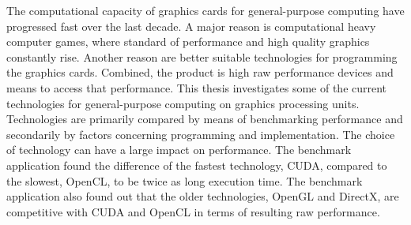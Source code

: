The computational capacity of graphics cards for general-purpose computing have progressed fast over the last decade. A major reason is computational heavy computer games, where standard of performance and high quality graphics constantly rise. Another reason are better suitable technologies for programming the graphics cards. Combined, the product is high raw performance devices and means to access that performance. This thesis investigates some of the current technologies for general-purpose computing on graphics processing units. Technologies are primarily compared by means of benchmarking performance and secondarily by factors concerning programming and implementation. The choice of technology can have a large impact on performance. The benchmark application found the difference of the fastest technology, CUDA, compared to the slowest, OpenCL, to be twice as long execution time. The benchmark application also found out that the older technologies, OpenGL and DirectX, are competitive with CUDA and OpenCL in terms of resulting raw performance.%